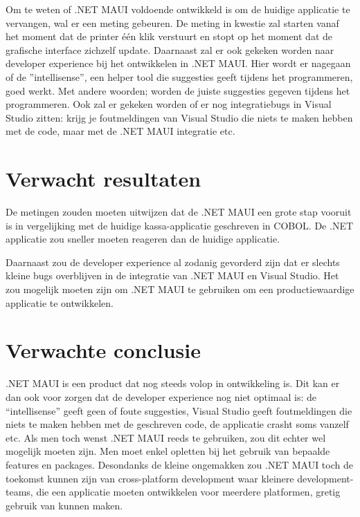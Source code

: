 Om te weten of .NET MAUI voldoende ontwikkeld is om de huidige applicatie te vervangen, wal er een meting gebeuren. De meting in kwestie zal starten vanaf het moment dat de printer één klik verstuurt en stopt op het moment dat de grafische interface zichzelf update. 
Daarnaast zal er ook gekeken worden naar developer experience bij het ontwikkelen in .NET MAUI. Hier wordt er nagegaan of de ”intellisense”, een helper tool die suggesties geeft tijdens het programmeren, goed werkt. Met andere woorden; worden de juiste suggesties gegeven tijdens het programmeren. Ook zal er gekeken worden of er nog integratiebugs in Visual Studio zitten: krijg je foutmeldingen van Visual Studio die niets te maken hebben met de code, maar met de .NET MAUI integratie etc.

\section{Verwacht resultaten}%
\label{sec:verwachte_resultaten}

De metingen zouden moeten uitwijzen dat de .NET MAUI een grote stap vooruit is in vergelijking met de huidige kassa-applicatie geschreven in COBOL. De .NET applicatie zou sneller moeten reageren dan de huidige applicatie.

Daarnaast zou de developer experience al zodanig gevorderd zijn dat er slechts kleine bugs overblijven in de integratie van .NET MAUI en Visual Studio. Het zou mogelijk moeten zijn om .NET MAUI te gebruiken om een productiewaardige applicatie te ontwikkelen.

\section{Verwachte conclusie}
\label{sec:verwachte_conclusie}

.NET MAUI is een product dat nog steeds volop in ontwikkeling is. Dit kan er dan ook voor zorgen dat de developer experience nog niet optimaal is: de “intellisense” geeft geen of foute suggesties, Visual Studio geeft foutmeldingen die niets te maken hebben met de geschreven code, de applicatie crasht soms vanzelf etc. Als men toch wenst .NET MAUI reeds te gebruiken, zou dit echter wel mogelijk moeten zijn. Men moet enkel opletten bij het gebruik van bepaalde features en packages.
Desondanks de kleine ongemakken zou .NET MAUI toch de toekomst kunnen zijn van cross-platform development waar kleinere development-teams, die een applicatie moeten ontwikkelen voor meerdere platformen, gretig gebruik van kunnen maken.